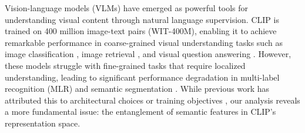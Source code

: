 \label{sec: Introduction}



Vision-language models (VLMs) have emerged as powerful tools for understanding visual content through natural language supervision. CLIP \cite{clip} is trained on 400 million image-text pairs (WIT-400M), enabling it to achieve remarkable performance in coarse-grained visual understanding tasks such as image classification \cite{coop}, image retrieval \cite{retrival}, and visual question answering \cite{vqa}. However, these models struggle with fine-grained tasks that require localized understanding, leading to significant performance degradation in multi-label recognition (MLR) \cite{mlmc,huang2024radiology} and semantic segmentation \cite{seg}. While previous work has attributed this to architectural choices \cite{ViT_need_register} or training objectives \cite{tagclip,dong2023maskclip}, our analysis reveals a more fundamental issue: the entanglement of semantic features in CLIP's representation space.

% 
% 


